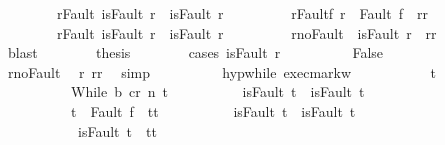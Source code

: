 \begin{isabellebody}
\ \ \ \ \ \ \ \ r{\isacharunderscore}Fault{\isacharcolon}\ {\isachardoublequoteopen}isFault\ r\ {\isasymlongrightarrow}\ isFault\ r{\isacharprime}{\isachardoublequoteclose}\ \isanewline
\ \ \ \ \ \ \ \ r{\isacharprime}{\isacharunderscore}Fault{\isacharunderscore}f{\isacharcolon}\ {\isachardoublequoteopen}r{\isacharprime}\ {\isacharequal}\ Fault\ f\ {\isasymlongrightarrow}\ r{\isacharprime}{\isacharequal}r{\isachardoublequoteclose}\ \isanewline
\ \ \ \ \ \ \ \ r{\isacharprime}{\isacharunderscore}Fault{\isacharcolon}\ {\isachardoublequoteopen}isFault\ r{\isacharprime}\ {\isasymlongrightarrow}\ isFault\ r{\isachardoublequoteclose}\ \isanewline
\ \ \ \ \ \ \ \ r{\isacharprime}{\isacharunderscore}noFault{\isacharcolon}\ {\isachardoublequoteopen}{\isasymnot}\ isFault\ r{\isacharprime}\ {\isasymlongrightarrow}\ r{\isacharprime}{\isacharequal}r{\isachardoublequoteclose}\isanewline
\ \ \ \ \ \ \ \ \isamarkupfalse%
\ blast\isanewline
\ \ \ \ \ \ \isamarkupfalse%
\ {\isacharquery}thesis\isanewline
\ \ \ \ \ \ \isamarkupfalse%
\ {\isacharparenleft}cases\ {\isachardoublequoteopen}isFault\ r{\isacharprime}{\isachardoublequoteclose}{\isacharparenright}\isanewline
\ \ \ \ \ \ \ \ \isamarkupfalse%
\ False\isanewline
\ \ \ \ \ \ \ \ \isamarkupfalse%
\ r{\isacharprime}{\isacharunderscore}noFault\ \isamarkupfalse%
\ r{\isacharprime}{\isacharcolon}\ {\isachardoublequoteopen}r{\isacharprime}{\isacharequal}r{\isachardoublequoteclose}\ \isamarkupfalse%
\ simp\isanewline
\ \ \ \ \ \ \ \ \isamarkupfalse%
\ hyp{\isacharunderscore}while\ exec{\isacharunderscore}mark{\isacharunderscore}w\ \isanewline
\ \ \ \ \ \ \ \ \isamarkupfalse%
\ t{\isacharprime}\ \isanewline
\ \ \ \ \ \ \ \ \ \ {\isachardoublequoteopen}{\isasymGamma}{\isasymturnstile}{\isasymlangle}While\ b\ c{\isacharcomma}r{\isasymrangle}\ {\isacharequal}n{\isasymRightarrow}\ t{\isacharprime}{\isachardoublequoteclose}\isanewline
\ \ \ \ \ \ \ \ \ \ {\isachardoublequoteopen}isFault\ t\ {\isasymlongrightarrow}\ isFault\ t{\isacharprime}{\isachardoublequoteclose}\isanewline
\ \ \ \ \ \ \ \ \ \ {\isachardoublequoteopen}t{\isacharprime}\ {\isacharequal}\ Fault\ f\ {\isasymlongrightarrow}\ t{\isacharprime}{\isacharequal}t{\isachardoublequoteclose}\isanewline
\ \ \ \ \ \ \ \ \ \ {\isachardoublequoteopen}isFault\ t{\isacharprime}\ {\isasymlongrightarrow}\ isFault\ t{\isachardoublequoteclose}\isanewline
\ \ \ \ \ \ \ \ \ \ {\isachardoublequoteopen}{\isasymnot}\ isFault\ t{\isacharprime}\ {\isasymlongrightarrow}\ t{\isacharprime}{\isacharequal}t{\isachardoublequoteclose}\isanewline

\end{isabellebody}
